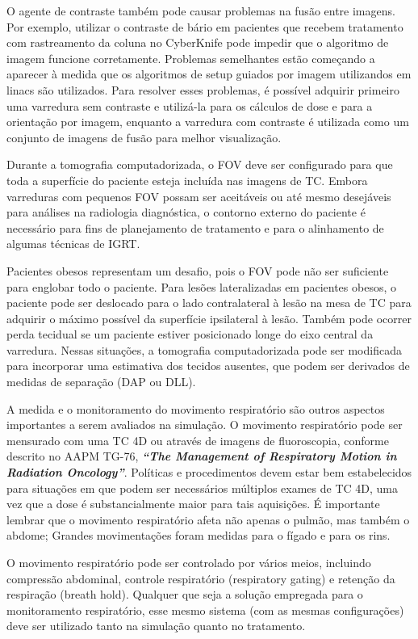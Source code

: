 \documentclass[11pt,a4paper]{article}
\newcounter{exemplo}
\begin{document}
	O agente de contraste também pode causar problemas na fusão entre imagens. Por exemplo, utilizar o contraste de bário em pacientes que recebem tratamento com rastreamento da coluna no CyberKnife pode impedir que o algoritmo de imagem funcione corretamente. Problemas semelhantes estão começando a aparecer à medida que os algoritmos de setup guiados por imagem utilizandos em linacs são utilizados. Para resolver esses problemas, é possível adquirir primeiro uma varredura sem contraste e utilizá-la para os cálculos de dose e para a orientação por imagem, enquanto a varredura com contraste é utilizada como um conjunto de imagens de fusão para melhor visualização.

	Durante a tomografia computadorizada, o FOV deve ser configurado para que toda a superfície do paciente esteja incluída nas imagens de TC. Embora varreduras com pequenos FOV possam ser aceitáveis ou até mesmo desejáveis para análises na radiologia diagnóstica, o contorno externo do paciente é necessário para fins de planejamento de tratamento e para o alinhamento de algumas técnicas de IGRT.
	
	Pacientes obesos representam um desafio, pois o FOV pode não ser suficiente para englobar todo o paciente. Para lesões lateralizadas em pacientes obesos, o paciente pode ser deslocado para o lado contralateral à lesão na mesa de TC para adquirir o máximo possível da superfície ipsilateral à lesão. Também pode ocorrer perda tecidual se um paciente estiver posicionado longe do eixo central da varredura. Nessas situações, a tomografia computadorizada pode ser modificada para incorporar uma estimativa dos tecidos ausentes, que podem ser derivados de medidas de separação (DAP ou DLL).

	A medida e o monitoramento do movimento respiratório são outros aspectos importantes a serem avaliados na simulação. O movimento respiratório pode ser mensurado com uma TC 4D ou através de imagens de fluoroscopia, conforme descrito no AAPM TG-76, \textit{\textbf{``The Management of Respiratory Motion in Radiation Oncology''}}. Políticas e procedimentos devem estar bem estabelecidos para situações em que podem ser necessários múltiplos exames de TC 4D, uma vez que a dose é substancialmente maior para tais aquisições. É importante lembrar que o movimento respiratório afeta não apenas o pulmão, mas também o abdome; Grandes movimentações foram medidas para o fígado e para os rins.
	
	O movimento respiratório pode ser controlado por vários meios, incluindo compressão abdominal, controle respiratório (respiratory gating) e retenção da respiração (breath hold). Qualquer que seja a solução empregada para o monitoramento respiratório, esse mesmo sistema (com as mesmas configurações) deve ser utilizado tanto na simulação quanto no tratamento. 
\end{document}
